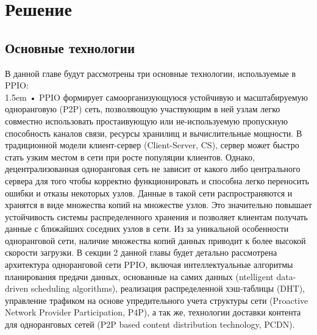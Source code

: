 \documentclass[10pt,a4paper]{article}
\begin{document}
\section{Решение} %
\vspace{-0.5em}
\subsection{Основные технологии} %
В данной главе будут рассмотрены три основные технологии, используемые в PPIO:
\vspace{-0.6em}
\\ 

\hangindent 1.5em
\noindent   
• PPIO формирует самоорганизующуюся устойчивую и масштабируемую одноранговую (P2P) сеть, позволяющую участвующим в ней узлам легко совместно использовать простаивующую или не-используемую пропускную способность каналов связи, ресурсы хранилищ и вычислительные мощности. В традиционной модели клиент-сервер (Client-Server, CS), сервер может быстро стать узким местом в сети при росте популяции клиентов. Однако, децентрализованная одноранговая сеть не зависит от какого либо центрального сервера для того чтобы корректно функционировать и способна легко переносить ошибки и отказы некоторых узлов. Данные в такой сети распространяются и хранятся в виде множества копий на множестве узлов. Это значительно повышает устойчивость системы распределенного хранения и позволяет клиентам получать данные с ближайших соседних узлов в сети. Из за уникальной особенности одноранговой сети, наличие множества копий данных приводит к более высокой скорости загрузки. В секции 2 данной главы будет детально рассмотрена архитектура одноранговой сети PPIO, включая интеллектуальные алгоритмы планирования предачи данных, основанные на самих данных (ntelligent data-driven scheduling algorithms), реализация распределенной хэш-таблицы (DHT), управление трафиком на основе упредительного учета структуры сети (Proactive Network Provider Participation, P4P), а так же, технологии доставки контента для одноранговых сетей (P2P based content distribution technology, PCDN).
\vspace{-0.6em}
\\ 
\end{document}

